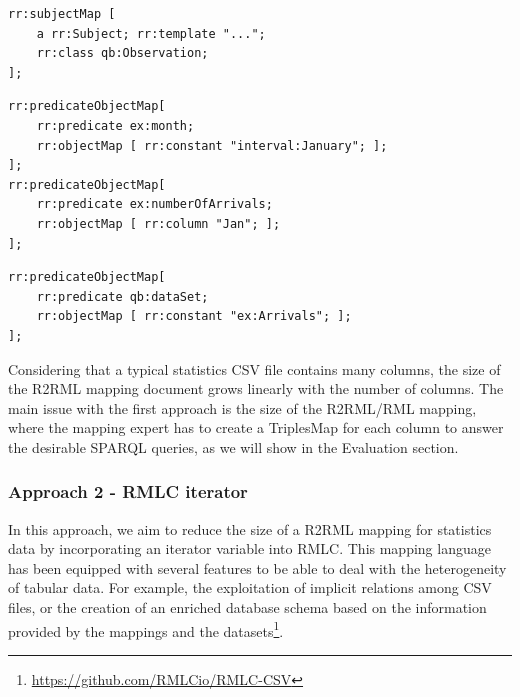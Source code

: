 \begin{lstlisting}[float,caption=Observation mapping,frame=tlrb,label={list:observation}, columns=fullflexible]
rr:subjectMap [ 
    a rr:Subject; rr:template "..."; 
    rr:class qb:Observation; 
];
\end{lstlisting}

\begin{lstlisting}[float,caption=Dimension slice mapping,frame=tlrb,label={list:dimension}, columns=fullflexible]
rr:predicateObjectMap[ 
    rr:predicate ex:month; 
    rr:objectMap [ rr:constant "interval:January"; ];  
];
rr:predicateObjectMap[ 
    rr:predicate ex:numberOfArrivals; 
    rr:objectMap [ rr:column "Jan"; ]; 
];
\end{lstlisting}

\begin{lstlisting}[float,caption=Dataset mapping,frame=tlrb,label={list:dataset}, columns=fullflexible]
rr:predicateObjectMap[ 
    rr:predicate qb:dataSet; 
    rr:objectMap [ rr:constant "ex:Arrivals"; ];
];
\end{lstlisting}

Considering that a typical statistics CSV file contains many columns, the size of the R2RML mapping document grows linearly with the number of columns. The main issue with the first approach is the size of the R2RML/RML mapping, where the mapping expert has to create a TriplesMap for each column to answer the desirable SPARQL queries, as we will show in the Evaluation section.

\subsubsection{Approach 2 - RMLC iterator}
In this approach, we aim to reduce the size of a R2RML mapping for statistics data by incorporating an iterator variable into RMLC. This mapping language has been equipped with several features to be able to deal with the heterogeneity of tabular data. For example, the exploitation of implicit relations among CSV files, or the creation of an enriched database schema based on the information provided by the mappings and the datasets\footnote{\url{https://github.com/RMLCio/RMLC-CSV}}.


